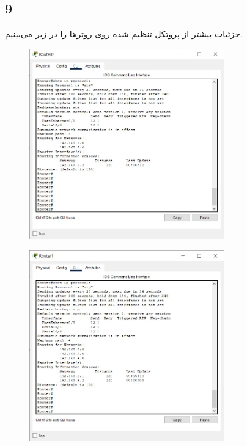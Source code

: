 \documentclass{article}
\begin{document}
\subsection{9}
جزئیات بیشتر از پروتکل  تنظیم شده روی روتر‌ها را در زیر می‌بینیم.
\begin{figure}[H]
    \centering
    \includegraphics[width=0.75\textwidth]{figures/8.jpg}
    \caption{}
    \label{fig:fig1}
\end{figure}
\begin{figure}[H]
    \centering
    \includegraphics[width=0.75\textwidth]{figures/9.jpg}
    \caption{}
    \label{fig:fig1}
\end{figure}
\end{document}
